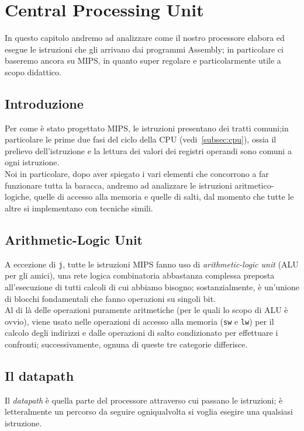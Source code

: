 \documentclass[class=book, crop=false, oneside]{standalone}
\begin{document}
\chapter{Central Processing Unit}

In questo capitolo andremo ad analizzare come il nostro processore elabora ed esegue le istruzioni che gli arrivano dai programmi Assembly; in particolare ci baseremo ancora su MIPS, in quanto super regolare e particolarmente utile a scopo didattico.\\

\section{Introduzione}
Per come è stato progettato MIPS, le istruzioni presentano dei tratti comuni;in particolare le prime due fasi del ciclo della CPU (vedi~\ref{subsec:cpu}), ossia il prelievo dell'istruzione e la lettura dei valori dei registri operandi sono comuni a ogni istruzione.\\
Noi in particolare, dopo aver spiegato i vari elementi che concorrono a far funzionare tutta la baracca, andremo ad analizzare le istruzioni aritmetico-logiche, quelle di accesso alla memoria e quelle di salti, dal momento che tutte le altre si implementano con tecniche simili.

\section{Arithmetic-Logic Unit}
A eccezione di \texttt{j}, tutte le istruzioni MIPS fanno uso di \emph{arithmetic-logic unit} (ALU per gli amici), una rete logica combinatoria abbastanza complessa preposta all'esecuzione di tutti calcoli di cui abbiamo bisogno; sostanzialmente, è un’unione di blocchi fondamentali che fanno operazioni su singoli bit.\\
Al di là delle operazioni puramente aritmetiche (per le quali lo scopo di ALU è ovvio), viene usato nelle operazioni di accesso alla memoria (\texttt{sw} e \texttt{lw}) per il calcolo degli indirizzi e dalle operazioni di salto condizionato per effettuare i confronti; successivamente, ognuna di queste tre categorie differisce. \\

\section{Il datapath}
Il \emph{datapath} è quella parte del processore attraverso cui passano le istruzioni; è letteralmente un percorso da seguire ogniqualvolta si voglia esegire una qualsiasi istruzione.
\end{document}
